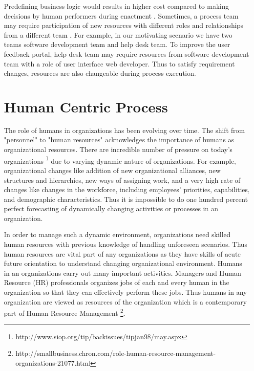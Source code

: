 Predefining business logic would results in higher cost compared to making decisions by human performers during enactment \cite{Sungur2014}. Sometimes, a process team may require participation of  new resources with different roles and relationships from a different team \cite{Matthews2011,Matthews2012}. For example, in our motivating scenario we have two teams  software development team and help desk team. To improve the user feedback portal, help desk team may require resources from software development team with a role of user interface web developer. Thus to satisfy requirement changes, resources are also changeable during process execution. 

\section{Human Centric Process}
\label{sec:humancentric}
The role of humans in organizations has been evolving over time. The shift from "personnel" to "human resources" acknowledges the importance of humans as organizational resources. There are incredible number of pressure on today's organizations \footnote{http://www.siop.org/tip/backissues/tipjan98/may.aspx} due to varying dynamic nature of organizations. For example, organizational changes like addition of new organizational alliances, new structures and hierarchies, new ways of assigning work, and a very high rate of changes like changes in the workforce, including employees' priorities, capabilities, and demographic characteristics. Thus it is impossible to do one hundred percent perfect forecasting of dynamically changing activities or processes in an organization.

In order to manage such a dynamic environment, organizations need skilled human resources with previous knowledge of handling unforeseen scenarios. Thus human resources are vital part of any organizations as they have skills of acute future orientation to understand changing organizational environment. Humans in an organizations carry out many important activities. Managers and Human Resource (HR) professionals organizes jobs of each and every human in the organization so that they can effectively perform these jobs. Thus humans in any organization are viewed as resources of the organization which is a contemporary part of Human Resource Management \footnote{http://smallbusiness.chron.com/role-human-resource-management-organizations-21077.html}.

